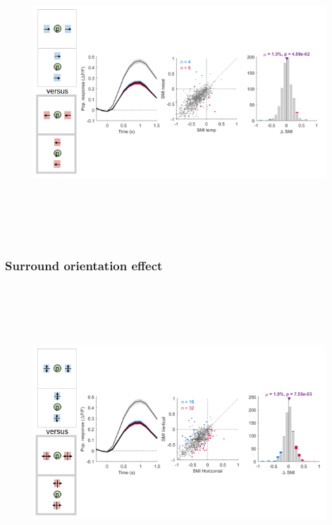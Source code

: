 \begin{figure}[H] \centering \includegraphics[width=11cm,height=11cm,keepaspectratio]{Figures/7.Results/finalPopulation/sel/diagrams/5.png} 
\end{figure}

\subsubsection{Surround orientation effect}

\begin{figure}[H] \centering \includegraphics[width=11cm,height=11cm,keepaspectratio]{Figures/7.Results/finalPopulation/sel/diagrams/6.png} 
\end{figure}

